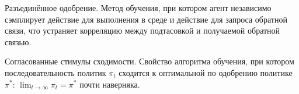 

\begin{definition}
    \label{def:decoupled_approval}
    Разъединённое одобрение. Метод обучения, при котором агент независимо сэмплирует действие для выполнения в среде и действие для запроса обратной связи, что устраняет корреляцию между подтасовкой и получаемой обратной связью.
\end{definition}


\begin{definition}
    \label{def:aligned_convergence_incentives}
    Согласованные стимулы сходимости. Свойство алгоритма обучения, при котором последовательность политик $\pi_t$ сходится к оптимальной по одобрению политике $\pi^*$: $\lim_{t \to \infty} \pi_t = \pi^*$ почти наверняка.

\end{definition}

